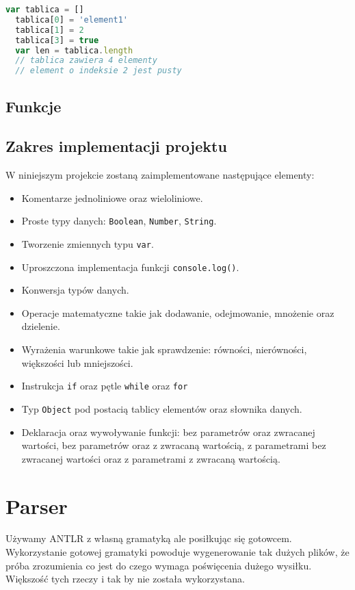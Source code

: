 \begin{lstlisting}[language=JavaScript, caption=Przykład przypisania elementów o różnych typach , label=alg:array5]
  var tablica = []
  tablica[0] = 'element1'
  tablica[1] = 2
  tablica[3] = true
  var len = tablica.length 
  // tablica zawiera 4 elementy
  // element o indeksie 2 jest pusty
\end{lstlisting}

\subsection{Funkcje}

\subsection{Zakres implementacji projektu}
W niniejszym projekcie zostaną zaimplementowane następujące elementy: 
\begin{itemize}
  \item Komentarze jednoliniowe oraz wieloliniowe.
  \item Proste typy danych: \texttt{Boolean}, \texttt{Number}, \texttt{String}.
  \item Tworzenie zmiennych typu \texttt{var}.
  \item Uproszczona implementacja funkcji \texttt{console.log()}.
  \item Konwersja typów danych.
  \item Operacje matematyczne takie jak dodawanie, odejmowanie, mnożenie oraz dzielenie.
  \item Wyrażenia warunkowe takie jak sprawdzenie: równości, nierówności, większości lub mniejszości.
  \item Instrukcja \texttt{if} oraz pętle \texttt{while} oraz \texttt{for}
  \item Typ \texttt{Object} pod postacią tablicy elementów oraz słownika danych.
  \item Deklaracja oraz wywoływanie funkcji: bez parametrów oraz zwracanej wartości, bez parametrów oraz z zwracaną wartością, z parametrami bez zwracanej wartości oraz z parametrami z zwracaną wartością.
\end{itemize}


\section{Parser}
Używamy ANTLR z własną gramatyką ale posiłkując się gotowcem. Wykorzystanie gotowej gramatyki powoduje wygenerowanie tak dużych plików, że próba zrozumienia co jest do czego wymaga poświęcenia dużego wysiłku. Większość tych rzeczy i tak by nie została wykorzystana.

